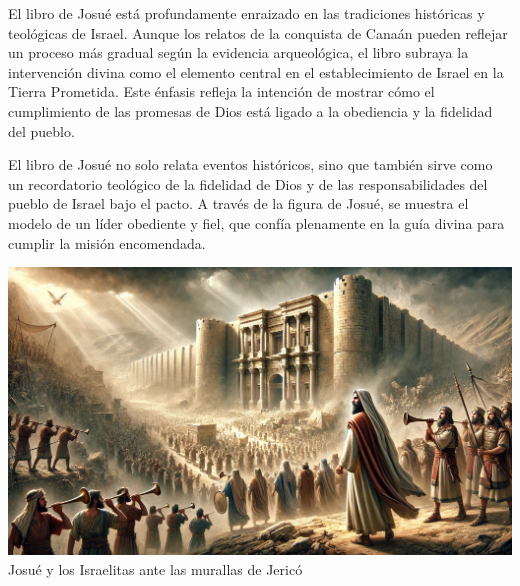 El libro de Josué está profundamente enraizado en las tradiciones históricas y teológicas de Israel. Aunque los relatos de la conquista de Canaán pueden reflejar un proceso más gradual según la evidencia arqueológica, el libro subraya la intervención divina como el elemento central en el establecimiento de Israel en la Tierra Prometida. Este énfasis refleja la intención de mostrar cómo el cumplimiento de las promesas de Dios está ligado a la obediencia y la fidelidad del pueblo.


El libro de Josué no solo relata eventos históricos, sino que también sirve como un recordatorio teológico de la fidelidad de Dios y de las responsabilidades del pueblo de Israel bajo el pacto. A través de la figura de Josué, se muestra el modelo de un líder obediente y fiel, que confía plenamente en la guía divina para cumplir la misión encomendada.



\begin{center}
	\includegraphics[width=0.7\linewidth]{graficas/josue.png}\\
	Josué y los Israelitas ante las murallas de Jericó\\
\end{center}




